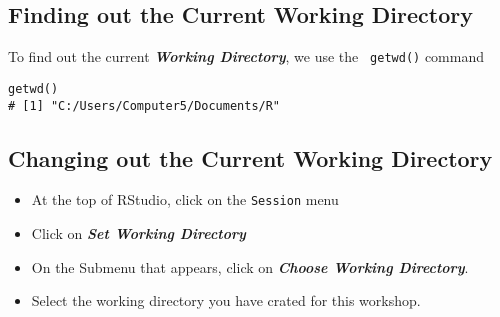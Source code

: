 \documentclass[a4paper,12pt]{article}
\begin{document}
\subsection*{Finding out the Current Working Directory}
To find out the current \textit{\textbf{Working Directory}}, we use the \texttt{ getwd()} command
\begin{framed}
\begin{verbatim}
getwd()
# [1] "C:/Users/Computer5/Documents/R"
\end{verbatim}
\end{framed}
\subsection*{Changing out the Current Working Directory}

\begin{itemize}
\item At the top of RStudio, click on the \texttt{Session} menu
\item Click on \textbf{\textit{Set Working Directory}}
\item On the Submenu that appears, click on \textbf{\textit{Choose Working Directory}}.
\item Select the working directory you have crated for this workshop.
\end{itemize}
\end{document}
